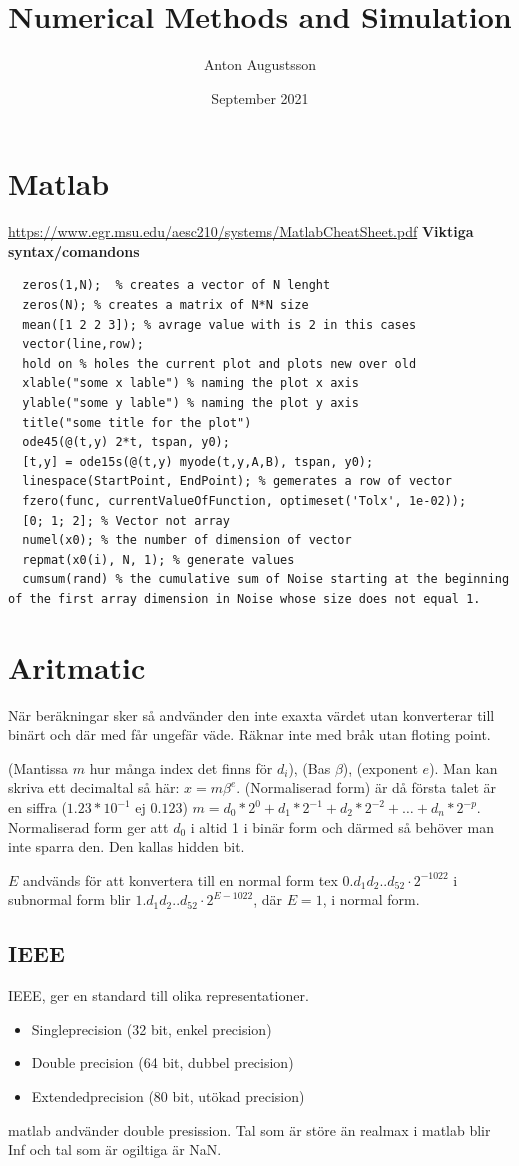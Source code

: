 \documentclass{article}
\title{Numerical Methods and Simulation}
\author{Anton Augustsson}
\date{September 2021}
\begin{document}
\maketitle
\newpage
\tableofcontents
\newpage


\section{Matlab}
\url{https://www.egr.msu.edu/aesc210/systems/MatlabCheatSheet.pdf} \newline
\textbf{Viktiga syntax/comandons}
\begin{verbatim}
  zeros(1,N);  % creates a vector of N lenght
  zeros(N); % creates a matrix of N*N size
  mean([1 2 2 3]); % avrage value with is 2 in this cases
  vector(line,row); 
  hold on % holes the current plot and plots new over old
  xlable("some x lable") % naming the plot x axis
  ylable("some y lable") % naming the plot y axis
  title("some title for the plot")
  ode45(@(t,y) 2*t, tspan, y0);
  [t,y] = ode15s(@(t,y) myode(t,y,A,B), tspan, y0);
  linespace(StartPoint, EndPoint); % gemerates a row of vector
  fzero(func, currentValueOfFunction, optimeset('Tolx', 1e-02)); 
  [0; 1; 2]; % Vector not array
  numel(x0); % the number of dimension of vector
  repmat(x0(i), N, 1); % generate values 
  cumsum(rand) % the cumulative sum of Noise starting at the beginning of the first array dimension in Noise whose size does not equal 1.
\end{verbatim}


\section{Aritmatic}
När beräkningar sker så andvänder den inte exaxta värdet utan konverterar till binärt och där med får
ungefär väde. Räknar inte med bråk utan floting point.

(Mantissa $m$ hur många index det finns för $d_i$), (Bas $\beta$), (exponent $e$). Man kan skriva ett decimaltal så här: $x=m\beta^e$.
(Normaliserad form) är då första talet är en siffra ($1.23*10^{-1}$ ej $0.123$)
$m=d_0*2^0+d_1*2^{-1}+d_2*2^{-2}+ \ldots +d_n*2^{-p}$. Normaliserad form ger att $d_0$ i altid 1 i binär form och
därmed så behöver man inte sparra den. Den kallas hidden bit.

$E$ andvänds för att konvertera till en normal form tex $0.d_1d_2..d_{52}\cdot{2^{-1022}}$ i subnormal form blir
$1.d_1d_2..d_{52}\cdot{2^{E-1022}}$, där $E=1$, i normal form.

\subsection{IEEE}
IEEE, ger en standard till olika representationer.
\begin{itemize}
  \item Singleprecision (32 bit, enkel precision)
  \item Double precision (64 bit, dubbel precision)
  \item Extendedprecision (80 bit, utökad precision)
\end{itemize}
matlab andvänder double presission.
Tal som är störe än realmax i matlab blir Inf och tal som är ogiltiga är NaN.
\end{document}
